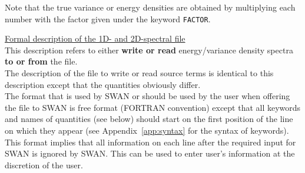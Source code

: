 \documentclass[12pt]{book}
\begin{document}
\noindent
Note that the true variance or energy densities are obtained by multiplying each number with the factor
given under the keyword {\tt FACTOR}.

\noindent
\underline{Formal description of the 1D- and 2D-spectral file}
\\[2ex]
\noindent
This description refers to either {\bf write or read} energy/variance density spectra {\bf to or from} the file.
\\[2ex]
\noindent
The description of the file to write or read source terms is identical to this description except that the
quantities obviously differ.
\\[2ex]
\noindent
The format that is used by SWAN or should be used by the user when offering the file to SWAN is free format (FORTRAN convention)
except that all keywords and names of quantities (see below) should start on the first position of the line on which they appear
(see Appendix~\ref{app:syntax} for the syntax of keywords). This format implies that all information on each line after the
required input for SWAN is ignored by SWAN. This can be used to enter user's information at the discretion of the user.
\\[2ex]
\noindent
\end{document}
